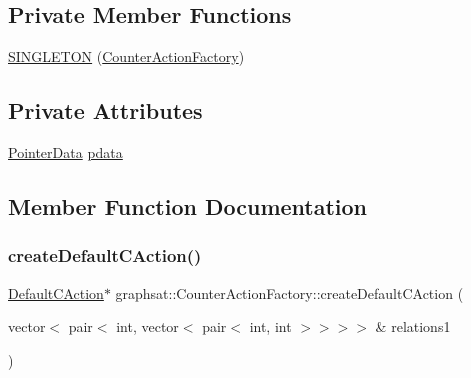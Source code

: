 \subsection*{Private Member Functions}
\begin{DoxyCompactItemize}
\item 
\mbox{\hyperlink{classgraphsat_1_1_counter_action_factory_a8d64bbd03225a58210e1fad11aa4da33}{S\+I\+N\+G\+L\+E\+T\+ON}} (\mbox{\hyperlink{classgraphsat_1_1_counter_action_factory}{Counter\+Action\+Factory}})
\end{DoxyCompactItemize}
\subsection*{Private Attributes}
\begin{DoxyCompactItemize}
\item 
\mbox{\hyperlink{classgraphsat_1_1_pointer_data}{Pointer\+Data}} \mbox{\hyperlink{classgraphsat_1_1_counter_action_factory_a89dbbfc09f0dc961e4a88c3b476d42cc}{pdata}}
\end{DoxyCompactItemize}


\subsection{Member Function Documentation}
\mbox{\label{classgraphsat_1_1_counter_action_factory_aec6aefcf28eaedeb5985cc31c8900b46}} 
\subsubsection{\texorpdfstring{createDefaultCAction()}{createDefaultCAction()}}
{\footnotesize\ttfamily \mbox{\hyperlink{classgraphsat_1_1_default_c_action}{Default\+C\+Action}}$\ast$ graphsat\+::\+Counter\+Action\+Factory\+::create\+Default\+C\+Action (\begin{DoxyParamCaption}\item[{vector$<$ pair$<$ int, vector$<$ pair$<$ int, int $>$$>$$>$$>$ \&}]{relations1 }\end{DoxyParamCaption})\hspace{0.3cm}{\ttfamily [inline]}}

